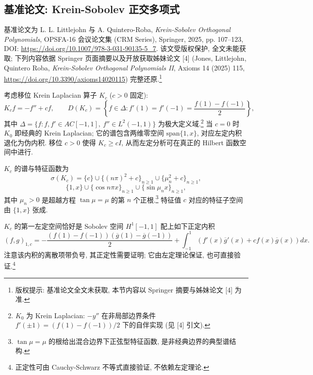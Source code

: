 \documentclass[UTF8]{ctexart}
\begin{document}
\subsection{基准论文: Krein-Sobolev 正交多项式}

基准论文为 L. L. Littlejohn 与 A. Quintero-Roba, \emph{Krein-Sobolev Orthogonal
Polynomials}, OPSFA-16 会议论文集 (CRM Series), Springer, 2025, pp. 107--123,
DOI: \url{https://doi.org/10.1007/978-3-031-90135-5_7}. 该文受版权保护, 全文未能获取; 下列内容依据
Springer 页面摘要以及开放获取姊妹论文 [4] (Jones, Littlejohn, Quintero Roba,
\emph{Krein-Sobolev Orthogonal Polynomials II}, Axioms 14 (2025) 115, \url{https://doi.org/10.3390/axioms14020115}) 完整还原.\footnote{版权提示: 基准论文全文未获取, 本节内容以 Springer 摘要与姊妹论文 [4] 为准.}

考虑移位 Krein Laplacian 算子 $K_c$ ($c > 0$ 固定):
\begin{equation}
	K_c f = -f'' + c f, \qquad
	D(K_c) = \left\{ f \in \Delta : f'(1) = f'(-1) = \frac{f(1) - f(-1)}{2} \right\},
\end{equation}
其中 $\Delta = \{ f : f, f' \in AC[-1,1],\ f'' \in L^2(-1,1) \}$ 为极大定义域.\footnote{$K_0$ 为 Krein Laplacian: $-y''$ 在非局部边界条件 $f'(\pm 1) = (f(1)-f(-1))/2$ 下的自伴实现 (见 [4] 引文).}
当 $c = 0$ 时 $K_0$ 即经典的 Krein Laplacian; 它的谱包含两维零空间
$\mathrm{span}\{1, x\}$, 对应左定内积退化为伪内积. 移位 $c > 0$ 使得 $K_c \geq cI$,
从而左定分析可在真正的 Hilbert 函数空间中进行.

$K_c$ 的谱与特征函数为
\begin{equation}
	\sigma(K_c) = \{c\} \cup \{(n\pi)^2 + c\}_{n \geq 1} \cup \{\mu_n^2 + c\}_{n \geq 1},
\end{equation}
\begin{equation}
	\{1, x\} \cup \{\cos n\pi x\}_{n \geq 1} \cup \{\sin \mu_n x\}_{n \geq 1},
\end{equation}
其中 $\mu_n > 0$ 是超越方程 $\tan \mu = \mu$ 的第 $n$ 个正根.\footnote{$\tan\mu = \mu$ 的根给出混合边界下正弦型特征函数, 是非经典边界的典型谱结构.}
特征值 $c$ 对应的特征子空间由 $\{1, x\}$ 张成.

$K_c$ 的第一左定空间恰好是 Sobolev 空间 $H^1[-1,1]$ 配上如下正定内积
\begin{equation}
	(f, g)_{1,c} = -\frac{(f(1) - f(-1))(\overline{g}(1) - \overline{g}(-1))}{2}
		+ \int_{-1}^{1} \left( f'(x)\overline{g}'(x) + c f(x)\overline{g}(x) \right) dx.
\end{equation}
注意该内积的离散项带负号, 其正定性需要证明; 它由左定理论保证, 也可直接验证.\footnote{正定性可由 Cauchy-Schwarz 不等式直接验证, 不依赖左定理论.}
\end{document}

